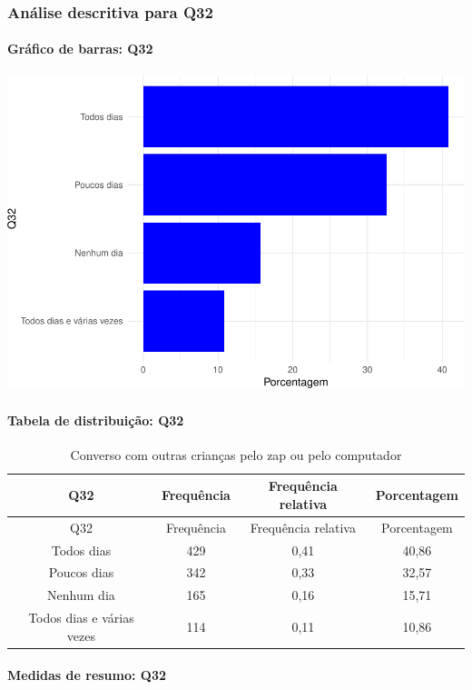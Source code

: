 \documentclass[]{article}
\let\oldparagraph\paragraph
\renewcommand{\paragraph}[1]{\oldparagraph{#1}\mbox{}}
\begin{document}
\hypertarget{anuxe1lise-descritiva-para-q32}{%
\subsubsection{Análise descritiva para Q32}\label{anuxe1lise-descritiva-para-q32}}

\hypertarget{gruxe1fico-de-barras-q32}{%
\paragraph{Gráfico de barras: Q32}\label{gruxe1fico-de-barras-q32}}

\begin{center}\includegraphics[width=0.75\linewidth]{relatorio_covid19_files/figure-latex/unnamed-chunk-1072-1} \end{center}

\hypertarget{tabela-de-distribuiuxe7uxe3o-q32}{%
\paragraph{Tabela de distribuição: Q32}\label{tabela-de-distribuiuxe7uxe3o-q32}}

\begin{longtable}[]{@{}cccc@{}}
\caption{\label{tab:unnamed-chunk-1073}Converso com outras crianças pelo zap ou pelo computador}\tabularnewline
\toprule
Q32 & Frequência & Frequência relativa & Porcentagem\tabularnewline
\midrule
\endfirsthead
\toprule
Q32 & Frequência & Frequência relativa & Porcentagem\tabularnewline
\midrule
\endhead
Todos dias & 429 & 0,41 & 40,86\tabularnewline
Poucos dias & 342 & 0,33 & 32,57\tabularnewline
Nenhum dia & 165 & 0,16 & 15,71\tabularnewline
Todos dias e várias vezes & 114 & 0,11 & 10,86\tabularnewline
\bottomrule
\end{longtable}

\hypertarget{medidas-de-resumo-q32}{%
\paragraph{Medidas de resumo: Q32}\label{medidas-de-resumo-q32}}
\end{document}

